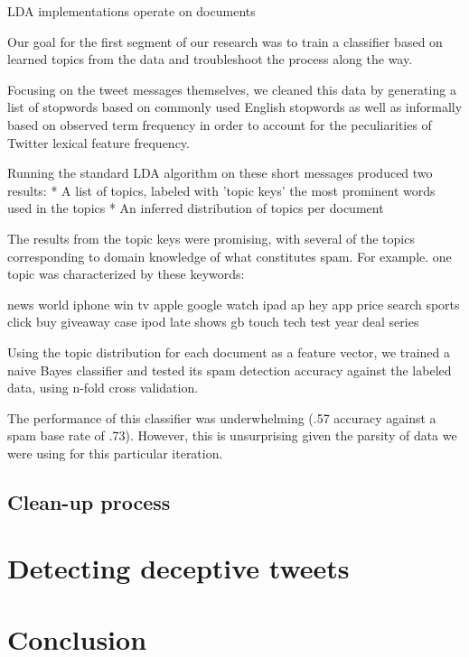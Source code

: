 \documentclass[times, 11pt, twocolumn]{article}
\begin{document}
LDA implementations operate on documents


Our  goal for the first segment of our research was to train a classifier  based on learned topics from the data and troubleshoot the process along  the way.

Focusing on the tweet messages themselves, we cleaned this data by generating a list of stopwords based on commonly used English stopwords as well as informally based on observed term frequency in order to account for the peculiarities of Twitter lexical feature frequency.

Running the standard LDA algorithm on these short messages produced two results:
	* A list of topics, labeled with 'topic keys'  the most prominent words used in the topics
	* An inferred distribution of topics per document
    
The results from the topic keys were promising, with several of the topics corresponding to domain knowledge of what constitutes spam.  For example. one topic was characterized by these keywords:

news world iphone win tv apple google watch ipad ap hey  app price search sports click buy giveaway case ipod late shows gb touch  tech test year deal series 

Using the topic distribution for each document as a feature vector, we trained a naive Bayes classifier and tested its spam detection accuracy against the labeled data, using n-fold cross validation.

The performance of this classifier was underwhelming (.57 accuracy against a spam base rate of .73).  However, this is unsurprising given the parsity of data we were using for this particular iteration.
\subsection{Clean-up process}

\section{Detecting deceptive tweets}

\section{Conclusion}




\end{document}
